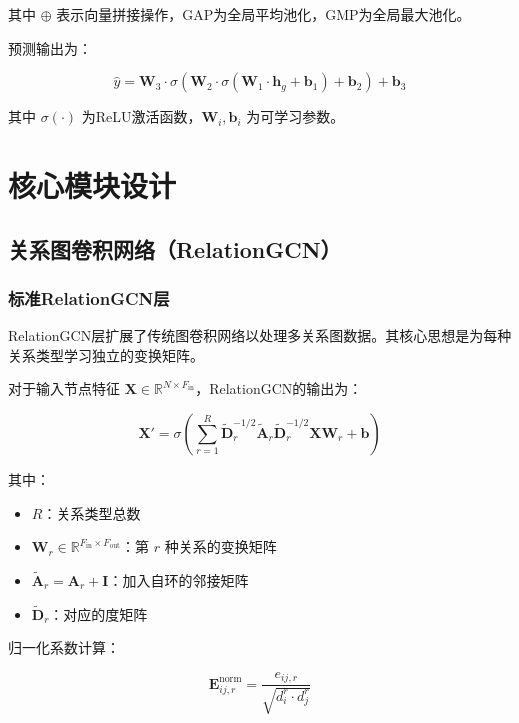 \documentclass[UTF8, a4paper, 12pt]{article}
\begin{document}
其中 $\oplus$ 表示向量拼接操作，GAP为全局平均池化，GMP为全局最大池化。

预测输出为：

\begin{equation}
\hat{y} = \mathbf{W}_3 \cdot \sigma\left(\mathbf{W}_2 \cdot \sigma\left(\mathbf{W}_1 \cdot \mathbf{h}_g + \mathbf{b}_1\right) + \mathbf{b}_2\right) + \mathbf{b}_3
\end{equation}

其中 $\sigma(\cdot)$ 为ReLU激活函数，$\mathbf{W}_i, \mathbf{b}_i$ 为可学习参数。

\newpage

\section{核心模块设计}

\subsection{关系图卷积网络（RelationGCN）}

\subsubsection{标准RelationGCN层}

RelationGCN层扩展了传统图卷积网络以处理多关系图数据。其核心思想是为每种关系类型学习独立的变换矩阵。

对于输入节点特征 $\mathbf{X} \in \mathbb{R}^{N \times F_{\text{in}}}$，RelationGCN的输出为：

\begin{equation}
\mathbf{X}' = \sigma\left( \sum_{r=1}^{R} \tilde{\mathbf{D}}_r^{-1/2} \tilde{\mathbf{A}}_r \tilde{\mathbf{D}}_r^{-1/2} \mathbf{X} \mathbf{W}_r + \mathbf{b} \right)
\end{equation}

其中：
\begin{itemize}
    \item $R$：关系类型总数
    \item $\mathbf{W}_r \in \mathbb{R}^{F_{\text{in}} \times F_{\text{out}}}$：第 $r$ 种关系的变换矩阵
    \item $\tilde{\mathbf{A}}_r = \mathbf{A}_r + \mathbf{I}$：加入自环的邻接矩阵
    \item $\tilde{\mathbf{D}}_r$：对应的度矩阵
\end{itemize}

归一化系数计算：

\begin{equation}
\mathbf{E}^{\text{norm}}_{ij,r} = \frac{e_{ij,r}}{\sqrt{d_i^r \cdot d_j^r}}
\end{equation}
\end{document}
